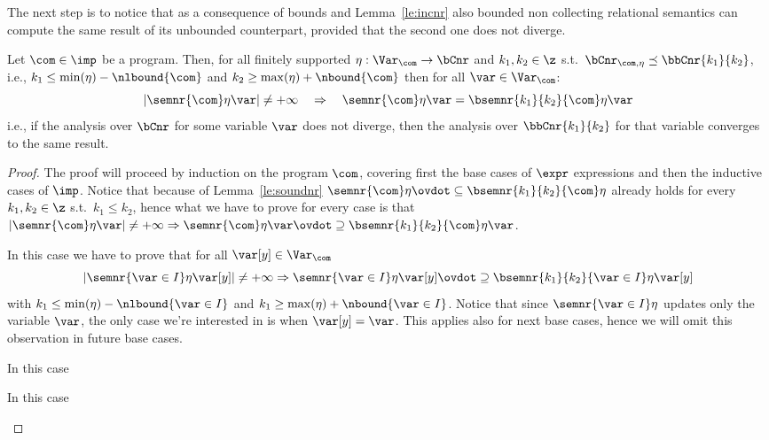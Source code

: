 The next step is to notice that as a consequence of bounds and
Lemma~\ref{le:incnr} also bounded non collecting relational semantics
can compute the same result of its unbounded counterpart, provided
that the second one does not diverge.

\begin{theorem}
  Let \(\com\in\imp\) be a program. Then, for all finitely supported
  \(\eta : \Var_{\com} \to \bCnr\) and \(k_1, k_2 \in \z\) s.t.\
  \(\bCnr_{\com,\eta} \preceq \bbCnr{k_1}{k_2}\), i.e.,
  \(k_1 \leq \min(\eta) - \nlbound{\com}\) and
  \(k_2 \geq \max(\eta) + \nbound{\com}\) then for all
  \(\var\in\Var_{\com}\):
  \begin{equation*}
    |\semnr{\com}\eta\var| \neq +\infty \quad \Rightarrow \quad \semnr{\com}\eta\var = \bsemnr{k_1}{k_2}{\com}\eta\var
  \end{equation*}
  i.e., if the analysis over \(\bCnr\) for some variable \(\var\) does
  not diverge, then the analysis over \(\bbCnr{k_1}{k_2}\) for that
  variable converges to the same result.
\end{theorem}

\begin{proof}
  The proof will proceed by induction on the program \(\com\),
  covering first the base cases of \(\expr\) expressions and then the
  inductive cases of \(\imp\). Notice that because of
  Lemma~\ref{le:soundnr}
  \(\semnr{\com} \eta \ovdot\subseteq \bsemnr{k_1}{k_2}{\com}\eta\)
  already holds for every \(k_1, k_2 \in \z\) s.t.\ \(k_1\leq k_2\),
  hence what we have to prove for every case is that
  \(|\semnr{\com}\eta\var| \neq +\infty \Rightarrow \semnr{\com} \eta
  \var \ovdot\supseteq \bsemnr{k_1}{k_2}{\com}\eta\var\).
  \begin{inductive}
     In this case we have to prove that for all
    \(\var[y] \in \Var_{\com}\)
    \[|\semnr{\var\in I}\eta\var[y]| \neq + \infty \Rightarrow
      \semnr{\var\in I}\eta \var[y] \ovdot\supseteq
      \bsemnr{k_1}{k_2}{\var\in I}\eta\var[y]\] with
    \(k_1\leq \min(\eta) - \nlbound{\var \in I}\) and
    \(k_1\geq \max(\eta) + \nbound{\var \in I}\). Notice that since
    \(\semnr{\var \in I}\eta\) updates only the variable \(\var\), the
    only case we're interested in is when \(\var[y] = \var\). This
    applies also for next base cases, hence we will omit this
    observation in future base cases.

     In this case

     In this case
  \end{inductive}
\end{proof}
